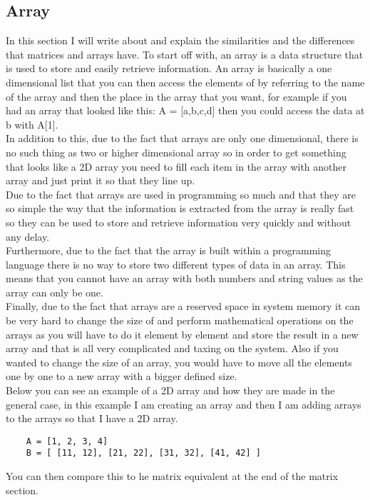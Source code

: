 \documentclass{article}
\begin{document}
\subsection{Array}
In this section I will write about and explain the similarities and the differences that matrices and arrays have. To start off with, an array is a data structure that is used to store and easily retrieve information. An array is basically a one dimensional list that you can then access the elements of by referring to the name of the array and then the place in the array that you want, for example if you had an array that looked like this: A = [a,b,c,d] then you could access the data at b with A[1]. 
\\
In addition to this, due to the fact that arrays are only one dimensional, there is no such thing as two or higher dimensional array so in order to get something that looks like a 2D array you need to fill each item in the array with another array and just print it so that they line up.  
\\
Due to the fact that arrays are used in programming so much and that they are so simple the way that the information is extracted from the array is really fast so they can be used to store and retrieve information very quickly and without any delay.
\\
Furthermore, due to the fact that the array is built within a programming language there is no way to store two different types of data in an array. This means that you cannot have an array with both numbers and string values as the array can only be one. 
\\
Finally, due to the fact that arrays are a reserved space in system memory it can be very hard to change the size of and perform mathematical operations on the arrays as you will have to do it element by element and store the result in a new array and that is all very complicated and taxing on the system. Also if you wanted to change the size of an array, you would have to move all the elements one by one to a new array with a bigger defined size. 
\\
Below you can see an example of a 2D array and how they are made in the general case, in this example I am creating an array and then I am adding arrays to the arrays so that I have a 2D array.
\begin{lstlisting}
	A = [1, 2, 3, 4]
	B = [ [11, 12], [21, 22], [31, 32], [41, 42] ]
\end{lstlisting}
You can then compare this to he matrix equivalent at the end of the matrix section. 
\end{document}
